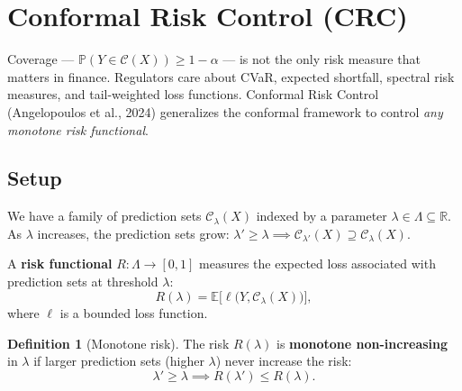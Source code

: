 \documentclass[11pt, a4paper]{article}
\theoremstyle{definition}
\newtheorem{definition}{Definition}[section]
\theoremstyle{plain}
\theoremstyle{remark}
\newcommand{\EV}{\mathbb{E}}
\newcommand{\PV}{\mathbb{P}}
\newcommand{\RV}{\mathbb{R}}
\newcommand{\Ccal}{\mathcal{C}}
\begin{document}
\section{Conformal Risk Control (CRC)}
\label{sec:crc}

Coverage --- $\PV(Y \in \Ccal(X)) \geq 1 - \alpha$ --- is not the only risk
measure that matters in finance.
Regulators care about CVaR, expected shortfall, spectral risk measures, and
tail-weighted loss functions.
Conformal Risk Control (Angelopoulos et al., 2024) generalizes the conformal
framework to control \emph{any monotone risk functional}.

\subsection{Setup}

We have a family of prediction sets $\Ccal_\lambda(X)$ indexed by a parameter
$\lambda \in \Lambda \subseteq \RV$.
As $\lambda$ increases, the prediction sets grow:
$\lambda' \geq \lambda \implies \Ccal_{\lambda'}(X) \supseteq \Ccal_\lambda(X)$.

A \textbf{risk functional} $R: \Lambda \to [0,1]$ measures the expected loss
associated with prediction sets at threshold $\lambda$:
\begin{equation}\label{eq:risk-functional}
    R(\lambda) = \EV\bigl[\ell\bigl(Y, \Ccal_\lambda(X)\bigr)\bigr],
\end{equation}
where $\ell$ is a bounded loss function.

\begin{definition}[Monotone risk]\label{def:monotone-risk}
The risk $R(\lambda)$ is \textbf{monotone non-increasing} in $\lambda$ if larger
prediction sets (higher $\lambda$) never increase the risk:
\begin{equation}
    \lambda' \geq \lambda \implies R(\lambda') \leq R(\lambda).
\end{equation}
\end{definition}
\end{document}
